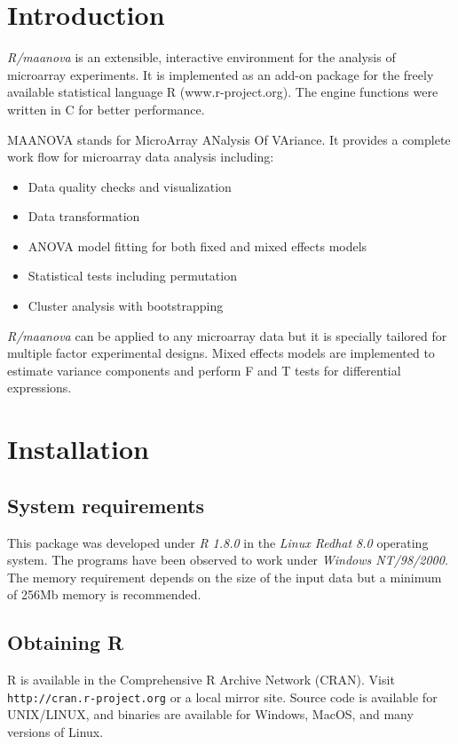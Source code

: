 \section{Introduction}
{\em R/maanova} is an extensible, 
interactive environment for the analysis of microarray experiments. 
It is implemented as an add-on
package for the freely available statistical language R (www.r-project.org).
The engine functions were written in C for better performance.

MAANOVA stands for MicroArray ANalysis Of VAriance. It provides a complete 
work flow for microarray data analysis including:
\begin{itemize}
\item Data quality checks and visualization
\item Data transformation
\item ANOVA model fitting for both fixed and mixed effects models
\item Statistical tests including permutation
\item Cluster analysis with bootstrapping
\end{itemize}

{\em R/maanova} can be applied to any microarray data but it is
specially tailored for multiple factor experimental designs.
Mixed effects models are implemented to estimate variance components 
and perform F and T tests for differential expressions.


\newpage
\section{Installation}
\subsection{System requirements}
This package was developed under {\em R 1.8.0} in the 
{\em Linux Redhat 8.0} operating system. The programs have been 
observed to work under {\em Windows NT/98/2000}. The memory requirement
depends on the size of the input data but a minimum of 256Mb memory
is recommended. 

\subsection{Obtaining R}
R is available in the Comprehensive R Archive Network (CRAN).
Visit \\{\tt http://cran.r-project.org} or a local mirror site.
Source code is available for UNIX/LINUX, and binaries are 
available for Windows, MacOS, and many versions of Linux.  

